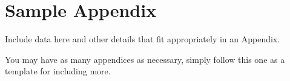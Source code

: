 \chapter{Sample Appendix}

Include data here and other details that fit appropriately in an Appendix.

You may have as many appendices as necessary, simply follow this one as a template for including more.